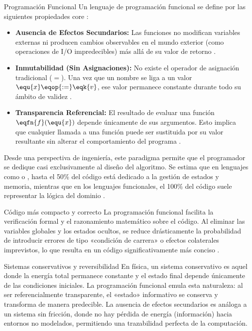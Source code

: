 \begin{definicion}{Programación Funcional}
Un lenguaje de programación funcional se define por las siguientes propiedades core \cite{HtDP}:
\begin{itemize}
    \item \textbf{Ausencia de Efectos Secundarios:} Las funciones no modifican variables externas ni producen cambios observables en el mundo exterior (como operaciones de I/O impredecibles) más allá de su valor de retorno \cite{SICP, HtDP}.
    \item \textbf{Inmutabilidad (Sin Asignaciones):} No existe el operador de asignación tradicional ($=$). Una vez que un nombre se liga a un valor $\equ{x} \eqop{:=} \eqk{v}$, ese valor permanece constante durante todo su ámbito de validez \cite{SICP}.
    \item \textbf{Transparencia Referencial:} El resultado de evaluar una función $\eqfn{f}(\equ{x})$ depende únicamente de sus argumentos. Esto implica que cualquier llamada a una función puede ser sustituida por su valor resultante sin alterar el comportamiento del programa \cite{SICP}.
\end{itemize}
\end{definicion}

Desde una perspectiva de ingeniería, este paradigma permite que el programador se dedique casi exclusivamente al diseño del algoritmo. Se estima que en lenguajes como  o , hasta el 50\% del código está dedicado a la gestión de estados y memoria, mientras que en los lenguajes funcionales, el 100\% del código suele representar la lógica del dominio \cite{HtDP}.

\begin{observacion}{Código más compacto y correcto}
La programación funcional facilita la verificación formal y el razonamiento matemático sobre el código. Al eliminar las variables globales y los estados ocultos, se reduce drásticamente la probabilidad de introducir errores de tipo «condición de carrera» o efectos colaterales imprevistos, lo que resulta en un código significativamente más conciso \cite{SICP, HtDP}.
\end{observacion}

\begin{fisicaconexion}{Sistemas conservativos y reversibilidad}
En física, un sistema conservativo es aquel donde la energía total permanece constante y el estado final depende únicamente de las condiciones iniciales. La programación funcional emula esta naturaleza: al ser referencialmente transparente, el «estado» informativo se conserva y transforma de manera predecible. La ausencia de efectos secundarios es análoga a un sistema sin fricción, donde no hay pérdida de energía (información) hacia entornos no modelados, permitiendo una trazabilidad perfecta de la computación.
\end{fisicaconexion}

